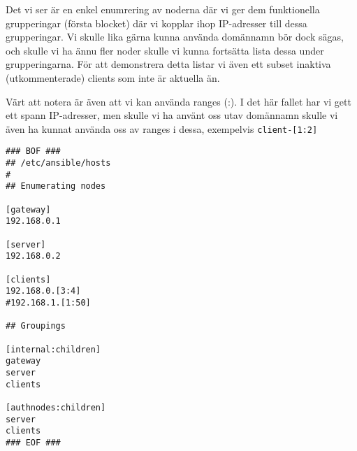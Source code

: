 Det vi ser är en enkel enumrering av noderna där vi ger dem funktionella grupperingar (första blocket) där vi
kopplar ihop IP-adresser till dessa grupperingar. Vi skulle lika gärna kunna använda domännamn bör dock sägas, och
skulle vi ha ännu fler noder skulle vi kunna fortsätta lista dessa under grupperingarna. För att demonstrera detta
listar vi även ett subset inaktiva (utkommenterade) clients som inte är aktuella än.

Värt att notera är även att vi kan använda ranges (:). I det här fallet har vi gett ett spann IP-adresser, men skulle vi ha använt oss utav domännamn skulle vi även ha kunnat använda oss av ranges i dessa, exempelvis \texttt{client-[1:2]}

\lstset{language=sh}
\begin{lstlisting}[frame=single]
### BOF ###
## /etc/ansible/hosts
#
## Enumerating nodes

[gateway]
192.168.0.1

[server]
192.168.0.2

[clients]
192.168.0.[3:4]
#192.168.1.[1:50]

## Groupings

[internal:children]
gateway
server
clients

[authnodes:children]
server
clients
### EOF ###
\end{lstlisting}

